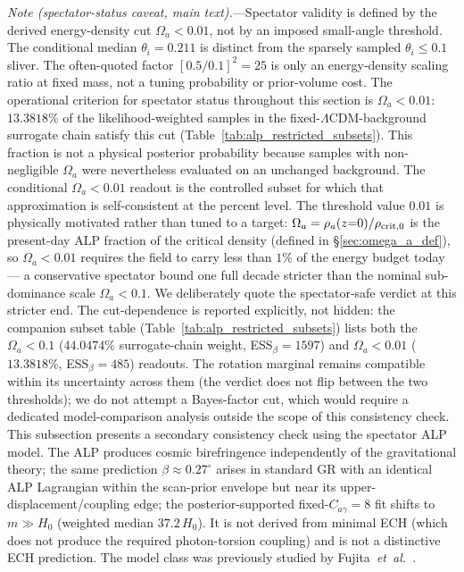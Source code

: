 \documentclass[aps,prd,twocolumn,superscriptaddress,showpacs,preprintnumbers,nofootinbib,longbibliography,floatfix]{revtex4-2}
\newcommand{\etal}{\textit{et~al.}}
\begin{document}
\textit{Note (spectator-status caveat, main text).}---Spectator validity is
defined by the derived energy-density cut $\Omega_a<0.01$, not by an imposed
small-angle threshold. The conditional median $\theta_i=0.211$ is distinct
from the sparsely sampled $\theta_i\le0.1$ sliver. The often-quoted factor
$[0.5/0.1]^2=25$ is only an energy-density scaling ratio at fixed mass, not a
tuning probability or prior-volume cost.
The operational criterion for spectator status throughout this section is
$\Omega_a < 0.01$: $13.3818\%$ of the likelihood-weighted samples in the
fixed-$\Lambda$CDM-background surrogate chain satisfy this cut
(Table~\ref{tab:alp_restricted_subsets}). This fraction is not a physical
posterior probability because samples with non-negligible $\Omega_a$ were
nevertheless evaluated on an unchanged background. The conditional
$\Omega_a<0.01$ readout is the controlled subset for which that approximation
is self-consistent at the percent level.
The threshold value $0.01$ is physically motivated rather than tuned to a
target: $\Omega_a = \rho_a(z{=}0)/\rho_{\rm crit,0}$ is the present-day ALP
fraction of the critical density (defined in
\S\ref{sec:omega_a_def}), so $\Omega_a < 0.01$ requires the field to carry
less than $1\%$ of the energy budget today --- a conservative spectator bound
one full decade stricter than the nominal sub-dominance scale
$\Omega_a < 0.1$. We deliberately quote the spectator-safe verdict at this
stricter end. The cut-dependence is reported explicitly, not hidden: the
companion subset table (Table~\ref{tab:alp_restricted_subsets}) lists both the
$\Omega_a < 0.1$ ($44.0474\%$ surrogate-chain weight, ESS$_\beta=1597$)
and $\Omega_a < 0.01$ ($13.3818\%$, ESS$_\beta=485$) readouts. The
rotation marginal remains compatible within its uncertainty
across them (the verdict does not flip between the two thresholds); we do not
attempt a Bayes-factor cut, which would require a dedicated model-comparison
analysis outside the scope of this consistency check.
This subsection presents a secondary consistency check using the
spectator ALP model. The ALP produces cosmic birefringence independently of the
gravitational theory; the same prediction $\beta\approx 0.27^\circ$ arises in
standard GR with an identical ALP Lagrangian within the scan-prior envelope
but near its upper-displacement/coupling edge; the posterior-supported
fixed-$C_{a\gamma}\!=\!8$ fit shifts to $m\!\gg\!H_0$ (weighted median $37.2\,H_0$).
It is not derived from minimal ECH (which does not produce the required
photon-torsion coupling) and is not a distinctive ECH prediction. The model class was previously
studied by Fujita~\etal~\cite{Fujita2021}.
\end{document}
